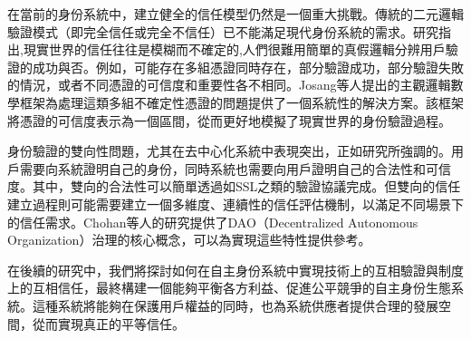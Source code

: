 在當前的身份系統中，建立健全的信任模型仍然是一個重大挑戰。傳統的二元邏輯驗證模式（即完全信任或完全不信任）已不能滿足現代身份系統的需求。研究\cite{s22155641}指出,現實世界的信任往往是模糊而不確定的,人們很難用簡單的真假邏輯分辨用戶驗證的成功與否。例如，可能存在多組憑證同時存在，部分驗證成功，部分驗證失敗的情況，或者不同憑證的可信度和重要性各不相同。Josang等人\cite{josang2006exploring}提出的主觀邏輯數學框架為處理這類多組不確定性憑證的問題提供了一個系統性的解決方案。該框架將憑證的可信度表示為一個區間，從而更好地模擬了現實世界的身份驗證過程。

身份驗證的雙向性問題，尤其在去中心化系統中表現突出，正如研究\cite{dhamija2008sevenflaws}所強調的。用戶需要向系統證明自己的身份，同時系統也需要向用戶證明自己的合法性和可信度。其中，雙向的合法性可以簡單透過如SSL之類的驗證協議完成。但雙向的信任建立過程則可能需要建立一個多維度、連續性的信任評估機制，以滿足不同場景下的信任需求。Chohan等人\cite{chohan2024decentralized}的研究提供了DAO（Decentralized Autonomous Organization）治理的核心概念，可以為實現這些特性提供參考。

在後續的研究中，我們將探討如何在自主身份系統中實現技術上的互相驗證與制度上的互相信任，最終構建一個能夠平衡各方利益、促進公平競爭的自主身份生態系統。這種系統將能夠在保護用戶權益的同時，也為系統供應者提供合理的發展空間，從而實現真正的平等信任。
